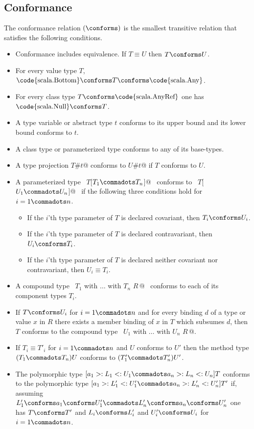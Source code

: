 \subsection{Conformance}
\label{sec:conformance}

The conformance relation $(\conforms)$ is the smallest 
transitive relation that satisfies the following conditions.
\begin{itemize}
\item Conformance includes equivalence. If $T \equiv U$ then $T \conforms U$.
\item For every value type $T$, 
      $\mbox{\code{scala.Bottom}} \conforms T \conforms \mbox{\code{scala.Any}}$. 
\item For every class type $T \conforms \mbox{\code{scala.AnyRef}}$ 
      one has $\mbox{\code{scala.Null}} \conforms T$.
\item A type variable or abstract type $t$ conforms to its upper bound and
      its lower bound conforms to $t$. 
\item A class type or parameterized type conforms to any of its base-types.
\item A type projection \lstinline@$T$#$t$@ conforms to \lstinline@$U$#$t$@ if 
      $T$ conforms to $U$.
\item A parameterized type ~\lstinline@$T$[$T_1 \commadots T_n$]@~ conforms to 
      ~\lstinline@$T$[$U_1 \commadots U_n$]@~ if
      the following three conditions hold for $i = 1 \commadots n$. 
      \begin{itemize}
      \item
      If the $i$'th type parameter of $T$ is declared covariant, then $T_i \conforms U_i$.
      \item
      If the $i$'th type parameter of $T$ is declared contravariant, then $U_i \conforms T_i$.
      \item
      If the $i$'th type parameter of $T$ is declared neither covariant 
      nor contravariant, then $U_i \equiv T_i$.
      \end{itemize}
\item A compound type ~\lstinline@$T_1$ with $\ldots$ with $T_n$ {$R\,$}@~ conforms to
      each of its component types $T_i$.
\item If $T \conforms U_i$ for $i = 1 \commadots n$ and for every
      binding $d$ of a type or value $x$ in $R$ there exists a member
      binding of $x$ in $T$ which subsumes $d$, then $T$ conforms to the
      compound type ~\lstinline@$U_1$ with $\ldots$ with $U_n$ {$R\,$}@.
\item If
        $T_i \equiv T'_i$ for $i = 1 \commadots n$ and $U$ conforms to $U'$ 
        then the method type $(T_1 \commadots T_n) U$ conforms to
        $(T'_1 \commadots T'_n) U'$.
\item The polymorphic type
$[a_1 >: L_1 <: U_1 \commadots a_n >: L_n <: U_n] T$ conforms to the polymorphic type
$[a_1 >: L'_1 <: U'_1 \commadots a_n >: L'_n <: U'_n] T'$ if, assuming
$L'_1 \conforms a_1 \conforms U'_1 \commadots L'_n \conforms a_n \conforms U'_n$ 
one has $T \conforms T'$ and $L_i \conforms L'_i$ and $U'_i \conforms U_i$
for $i = 1 \commadots n$.
\end{itemize}

